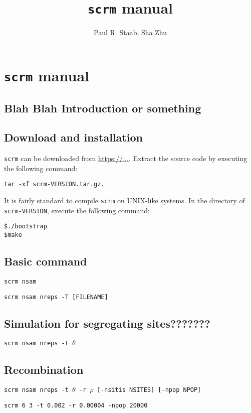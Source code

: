\documentclass{book}
\title{{\tt scrm} manual}
\author{Paul R. Staab, Sha Zhu}
\date{}
\newcommand{\cm}[1]{\begin{center}{\tt #1}\end{center}}
\begin{document}
\maketitle


\clearemptydoublepage
{}
\tableofcontents
\clearemptydoublepage
{}
\hypersetup{pageanchor=true,citecolor=blue}


\chapter{{\tt scrm} manual}


\section{Blah Blah Introduction or something}

\section{Download and installation}
{\tt scrm} can be downloaded from \url{https://...}. Extract the source code by executing the following command:
\cm{tar -xf scrm-VERSION.tar.gz.}

It is fairly standard to compile {\tt scrm} on UNIX-like systems. In the directory of {\tt scrm-VERSION}, execute the following command:
\begin{verbatim}
$./bootstrap
$make
\end{verbatim}

\section{Basic command}
\cm{scrm nsam }


\cm{scrm nsam nreps -T [FILENAME]}


\section{Simulation for segregating sites???????}
\cm{scrm nsam nreps -t $\theta$}



\section{Recombination}


\cm{scrm nsam nreps -t $\theta$ -r $\rho$ [-nsitis NSITES] [-npop NPOP] }

\cm{scrm 6 3 -t 0.002 -r 0.00004 -npop 20000 }
\end{document}
